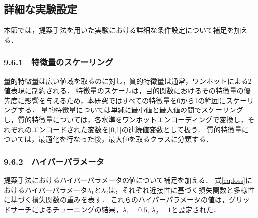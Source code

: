 \documentclass[dvipdfmx]{jreport}
\begin{document}
\subsection{詳細な実験設定}
本節では，提案手法を用いた実験における詳細な条件設定について補足を加える．
\subsubsection{9.6.1　特徴量のスケーリング}
量的特徴量は広い値域を取るのに対し，質的特徴量は通常，ワンホットによる2値表現に制約される．
特徴量のスケールは，目的関数におけるその特徴量の優先度に影響を与えるため，本研究ではすべての特徴量を0から1の範囲にスケーリングする．
量的特徴量については単純に最小値と最大値の間でスケーリングし，質的特徴量については，各水準をワンホットエンコーディングで変換し，それぞれのエンコードされた変数を[0,1]の連続値変数として扱う．
質的特徴量については，最適化を行なった後，最大値を取るクラスに分類する．


\subsubsection{9.6.2　ハイパーパラメータ}
提案手法におけるハイパーパラメータの値について補足を加える．
式\eqref{eq:loss}におけるハイパーパラメータ$\lambda_1$と$\lambda_2$は，それぞれ近接性に基づく損失関数と多様性に基づく損失関数の重みを表す．
これらのハイパーパラメータの値は，グリッドサーチによるチューニングの結果，$\lambda_1=0.5$, $\lambda_2=1$と設定された．
\end{document}
